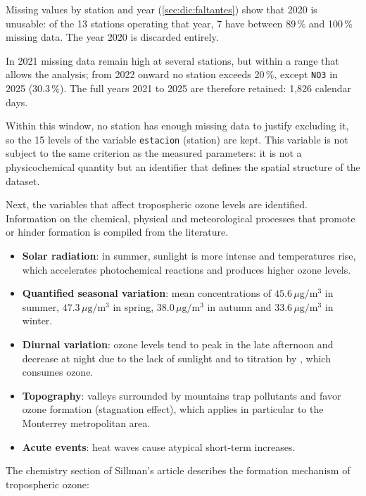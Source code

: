 Missing  values by station and year (\cref{sec:dic:faltantes}) show
that 2020 is unusable: of the 13 stations operating that year, 7 have between
89\,\% and 100\,\% missing data. The year 2020 is discarded entirely.

In 2021 missing data remain high at several stations, but within a range
that allows the analysis; from 2022 onward no station exceeds 20\,\%, except
\texttt{NO3} in 2025 (30.3\,\%). The full years 2021 to 2025 are therefore
retained: 1,826 calendar days.

Within this window, no station has enough missing data to justify excluding
it, so the 15 levels of the variable \texttt{estacion} (station) are kept.
This variable is not subject to the same criterion as the measured
parameters: it is not a physicochemical quantity but an identifier that
defines the spatial structure of the dataset.

Next, the variables that affect tropospheric ozone levels are identified.
Information on the chemical, physical and meteorological processes that
promote or hinder  formation is compiled from the literature.

\begin{itemize}
    \item \textbf{Solar radiation}: in summer, sunlight is more intense and
      temperatures rise, which accelerates photochemical reactions and
      produces higher ozone levels.
    \item \textbf{Quantified seasonal variation}: mean concentrations of
      $45.6\,\mu\mathrm{g}/\mathrm{m}^{3}$ in summer,
      $47.3\,\mu\mathrm{g}/\mathrm{m}^{3}$ in spring,
      $38.0\,\mu\mathrm{g}/\mathrm{m}^{3}$ in autumn and
      $33.6\,\mu\mathrm{g}/\mathrm{m}^{3}$ in winter.
    \item \textbf{Diurnal variation}: ozone levels tend to peak in the late
      afternoon and decrease at night due to the lack of sunlight and to
      titration by , which consumes ozone.
    \item \textbf{Topography}: valleys surrounded by mountains trap pollutants
      and favor ozone formation (stagnation effect), which applies in
      particular to the Monterrey metropolitan area.
    \item \textbf{Acute events}: heat waves cause atypical short-term
      increases.
\end{itemize}

The chemistry section of Sillman's article \parencite{SanfordSillman}
describes the formation mechanism of tropospheric ozone:

